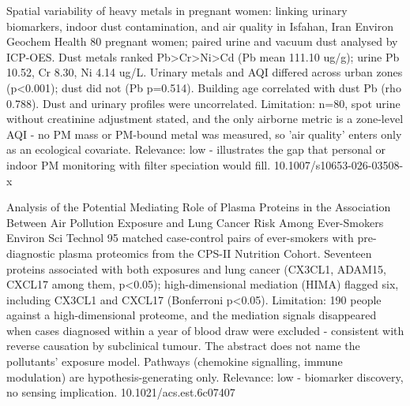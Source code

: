 \documentclass[10pt]{article}
\begin{document}
\par{}\baselineskip{}\baselineskip
{}

{Spatial variability of heavy metals in pregnant women: linking urinary biomarkers, indoor dust contamination, and air quality in Isfahan, Iran}
{Environ Geochem Health}
{80 pregnant women; paired urine and vacuum dust analysed by ICP-OES. Dust metals ranked Pb>Cr>Ni>Cd (Pb mean 111.10 ug/g); urine Pb 10.52, Cr 8.30, Ni 4.14 ug/L. Urinary metals and AQI differed across urban zones (p<0.001); dust did not (Pb p=0.514). Building age correlated with dust Pb (rho 0.788). Dust and urinary profiles were uncorrelated. Limitation: n=80, spot urine without creatinine adjustment stated, and the only airborne metric is a zone-level AQI - no PM mass or PM-bound metal was measured, so 'air quality' enters only as an ecological covariate. Relevance: low - illustrates the gap that personal or indoor PM monitoring with filter speciation would fill.}
{10.1007/s10653-026-03508-x}

\par{}\baselineskip{}\baselineskip
{}

{Analysis of the Potential Mediating Role of Plasma Proteins in the Association Between Air Pollution Exposure and Lung Cancer Risk Among Ever-Smokers}
{Environ Sci Technol}
{95 matched case-control pairs of ever-smokers with pre-diagnostic plasma proteomics from the CPS-II Nutrition Cohort. Seventeen proteins associated with both exposures and lung cancer (CX3CL1, ADAM15, CXCL17 among them, p<0.05); high-dimensional mediation (HIMA) flagged six, including CX3CL1 and CXCL17 (Bonferroni p<0.05). Limitation: 190 people against a high-dimensional proteome, and the mediation signals disappeared when cases diagnosed within a year of blood draw were excluded - consistent with reverse causation by subclinical tumour. The abstract does not name the pollutants' exposure model. Pathways (chemokine signalling, immune modulation) are hypothesis-generating only. Relevance: low - biomarker discovery, no sensing implication.}
{10.1021/acs.est.6c07407}

\par{}\baselineskip{}\baselineskip
{}
\end{document}
